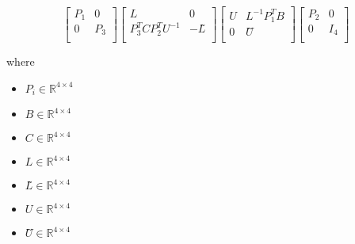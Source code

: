 \documentclass[12pt]{article}
\begin{document}
\[
\begin{bmatrix}
\textit{P}_{ 1 } & 0\\
0 & \textit{P}_{ 3 }\\
\end{bmatrix}\begin{bmatrix}
\textit{L} & 0\\
\textit{P}_{ 3 }^T\textit{C}\textit{P}_{ 2 }^T\textit{U}^{-1} & -\textit{L̃}\\
\end{bmatrix}\begin{bmatrix}
\textit{U} & \textit{L}^{-1}\textit{P}_{ 1 }^T\textit{B}\\
0 & \textit{Ũ}\\
\end{bmatrix}\begin{bmatrix}
\textit{P}_{ 2 } & 0\\
0 & I_{ 4 }\\
\end{bmatrix}
\]

where
\begin{itemize}
\item $\textit{P}_{\textit{i}} \in \mathbb{R}^{ 4 \times 4 }$
\item $\textit{B} \in \mathbb{R}^{ 4 \times 4 }$
\item $\textit{C} \in \mathbb{R}^{ 4 \times 4 }$
\item $\textit{L} \in \mathbb{R}^{ 4 \times 4 }$
\item $\textit{L̃} \in \mathbb{R}^{ 4 \times 4 }$
\item $\textit{U} \in \mathbb{R}^{ 4 \times 4 }$
\item $\textit{Ũ} \in \mathbb{R}^{ 4 \times 4 }$
\end{itemize}
\end{document}
